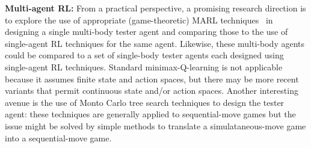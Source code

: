 \documentclass[10pt]{article}
\theoremstyle{plain}
\newenvironment{note}[1][]{\par\smallskip\noindent\textbf{#1}\rmfamily}{\smallskip}
\begin{document}
\begin{note}[Multi-agent RL:]
    From a practical perspective, a promising research direction is to explore the use of appropriate (game-theoretic) MARL techniques~\cite{Shoham:AIJ:2007} in designing a single multi-body tester agent and comparing those to the use of single-agent RL techniques for the same agent.
    Likewise, these multi-body agents could be compared to a set of single-body tester agents each designed using single-agent RL techniques.
    Standard minimax-Q-learning is not applicable because it assumes finite state and action spaces, but there may be more recent variants that permit continuous state and/or action spaces.
    Another interesting avenue is the use of Monto Carlo tree search techniques to design the tester agent: these techniques are generally applied to sequential-move games but the issue might be solved by simple methods to translate a simulataneous-move game into a sequential-move game.
\end{note}



\end{document}
